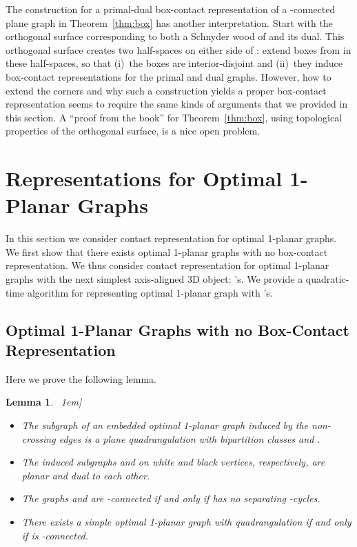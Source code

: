 \documentclass{article}
\newtheorem{lemma}[theorem]{Lemma}
\newcommand{\LLs}{'s\xspace}
\begin{document}
The construction for a primal-dual box-contact representation
 of a -connected plane graph  in Theorem~\ref{thm:box} has another interpretation. Start with the orthogonal surface  corresponding to both a Schnyder wood of  and its dual. This orthogonal surface  creates two half-spaces on either side of : extend boxes from  in these half-spaces, so that
(i)~the boxes are interior-disjoint and (ii)~they induce box-contact representations for the
 primal and dual graphs. However, how to extend the corners and why such a construction yields a proper box-contact representation seems to require the same kinds of arguments that we provided in this section.
A ``proof from the book'' for Theorem~\ref{thm:box}, using topological properties of the orthogonal surface, is a nice open problem.











\section{Representations for Optimal 1-Planar Graphs}

In this section we consider contact representation for optimal 1-planar graphs. We first show that
 there exists optimal 1-planar graphs with no box-contact representation. We thus consider contact
 representation for optimal 1-planar graphs with the next simplest axis-aligned 3D object: \LLs.
 We provide a quadratic-time algorithm for representing optimal 1-planar graph with \LLs.



\subsection{Optimal 1-Planar Graphs with no Box-Contact Representation}

Here we prove the following lemma.

\begin{lemma}
\label{lem:K5}{\ \-1em]}
 \begin{itemize}
  \item The subgraph of an embedded optimal 1-planar graph  induced by the non-crossing edges is a plane quadrangulation  with bipartition classes  and .
  \item The induced subgraphs  and  on white and black vertices, respectively, are planar and dual to each other.
  \item The graphs  and  are -connected if and only if  has no separating -cycles.
  \item There exists a simple optimal 1-planar graph with quadrangulation  if and only if  is -connected.
 \end{itemize}
\end{lemma}
\end{document}
